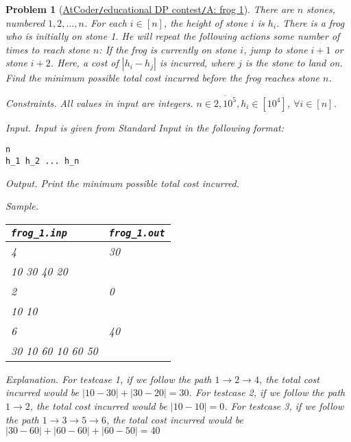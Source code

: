 \documentclass{article}
\newtheorem{problem}{Problem}
\begin{document}
\begin{problem}[\href{https://atcoder.jp/contests/dp/tasks/dp_a}{AtCoder{\tt/}educational DP contest{\tt/}A: frog 1}]
    There are $n$ stones, numbered $1,2,\ldots,n$. For each $i\in[n]$, the height of stone $i$ is $h_i$. There is a frog who is initially on stone 1. He will repeat the following actions some number of times to reach stone $n$: If the frog is currently on stone $i$, jump to stone $i + 1$ or stone $i + 2$. Here, a cost of $|h_i - h_j|$ is incurred, where $j$ is the stone to land on. Find the minimum possible total cost incurred before the frog reaches stone $n$.
    \item {\sf Constraints.} All values in input are integers. $n\in\overline{2,10^5},h_i\in[10^4]$, $\forall i\in[n]$.
    \item {\sf Input.} Input is given from Standard Input in the following format:
    \begin{verbatim}
n
h_1 h_2 ... h_n
    \end{verbatim}
    \item {\sf Output.} Print the minimum possible total cost incurred.
    \item {\sf Sample.}
    \begin{table}[H]
        \centering
        \begin{tabular}{|l|l|}
            \hline
            \verb|frog_1.inp| & \verb|frog_1.out| \\
            \hline
            4 & 30 \\
            10 30 40 20 & \\
            \hline
            2 & 0 \\
            10 10 & \\
            \hline
            6 & 40 \\
            30 10 60 10 60 50 & \\
            \hline
        \end{tabular}
    \end{table}
    \item {\sf Explanation.} For testcase 1, if we follow the path $1\to2\to4$, the total cost incurred would be $|10 - 30| + |30 - 20| = 30$. For testcase 2, if we follow the path $1\to2$, the total cost incurred would be $|10 - 10| = 0$. For testcase 3, if we follow the path $1\to3\to5\to6$, the total cost incurred would be $|30 - 60| + |60 - 60| + |60 - 50| = 40$
\end{problem}
\end{document}
